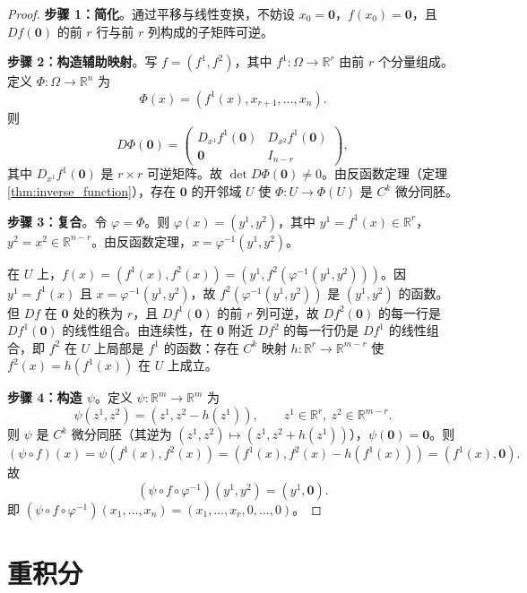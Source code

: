 \begin{proof}
\textbf{步骤 1：简化}。通过平移与线性变换，不妨设 $x_0 = \mathbf{0}$，$f(x_0) = \mathbf{0}$，且 $Df(\mathbf{0})$ 的前 $r$ 行与前 $r$ 列构成的子矩阵可逆。

\textbf{步骤 2：构造辅助映射}。写 $f = (f^1, f^2)$，其中 $f^1: \Omega \to \mathbb{R}^r$ 由前 $r$ 个分量组成。定义 $\Phi: \Omega \to \mathbb{R}^n$ 为
\[
\Phi(x) = (f^1(x), x_{r+1}, \dots, x_n).
\]
则
\[
D\Phi(\mathbf{0}) = \begin{pmatrix} D_{x^1} f^1(\mathbf{0}) & D_{x^2} f^1(\mathbf{0}) \\ \mathbf{0} & I_{n-r} \end{pmatrix},
\]
其中 $D_{x^1} f^1(\mathbf{0})$ 是 $r \times r$ 可逆矩阵。故 $\det D\Phi(\mathbf{0}) \neq 0$。由反函数定理（定理 \ref{thm:inverse_function}），存在 $\mathbf{0}$ 的开邻域 $U$ 使 $\Phi: U \to \Phi(U)$ 是 $C^k$ 微分同胚。

\textbf{步骤 3：复合}。令 $\varphi = \Phi$。则 $\varphi(x) = (y^1, y^2)$，其中 $y^1 = f^1(x) \in \mathbb{R}^r$，$y^2 = x^2 \in \mathbb{R}^{n-r}$。由反函数定理，$x = \varphi^{-1}(y^1, y^2)$。

在 $U$ 上，$f(x) = (f^1(x), f^2(x)) = (y^1, f^2(\varphi^{-1}(y^1, y^2)))$。因 $y^1 = f^1(x)$ 且 $x = \varphi^{-1}(y^1, y^2)$，故 $f^2(\varphi^{-1}(y^1, y^2))$ 是 $(y^1, y^2)$ 的函数。但 $Df$ 在 $\mathbf{0}$ 处的秩为 $r$，且 $Df^1(\mathbf{0})$ 的前 $r$ 列可逆，故 $Df^2(\mathbf{0})$ 的每一行是 $Df^1(\mathbf{0})$ 的线性组合。由连续性，在 $\mathbf{0}$ 附近 $Df^2$ 的每一行仍是 $Df^1$ 的线性组合，即 $f^2$ 在 $U$ 上局部是 $f^1$ 的函数：存在 $C^k$ 映射 $h: \mathbb{R}^r \to \mathbb{R}^{m-r}$ 使 $f^2(x) = h(f^1(x))$ 在 $U$ 上成立。

\textbf{步骤 4：构造 $\psi$}。定义 $\psi: \mathbb{R}^m \to \mathbb{R}^m$ 为
\[
\psi(z^1, z^2) = (z^1, z^2 - h(z^1)), \qquad z^1 \in \mathbb{R}^r,\ z^2 \in \mathbb{R}^{m-r}.
\]
则 $\psi$ 是 $C^k$ 微分同胚（其逆为 $(z^1, z^2) \mapsto (z^1, z^2 + h(z^1))$），$\psi(\mathbf{0}) = \mathbf{0}$。则
\[
(\psi \circ f)(x) = \psi(f^1(x), f^2(x)) = (f^1(x), f^2(x) - h(f^1(x))) = (f^1(x), \mathbf{0}).
\]
故
\[
(\psi \circ f \circ \varphi^{-1})(y^1, y^2) = (y^1, \mathbf{0}).
\]
即 $(\psi \circ f \circ \varphi^{-1})(x_1, \dots, x_n) = (x_1, \dots, x_r, 0, \dots, 0)$。
\end{proof}

\section{重积分}

